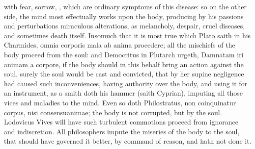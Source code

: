 {{with fear, sorrow, \etc{}, which are ordinary symptoms of this disease: so
on the other side, the mind most effectually works upon the body,
producing by his passions and perturbations miraculous alterations, as
melancholy, despair, cruel diseases, and sometimes death itself.
Insomuch that it is most true which Plato saith in his Charmides, omnia
corporis mala ab anima procedere; all the mischiefs of the body
proceed from the soul: and Democritus in Plutarch urgeth,
Damnatam iri animam a corpore, if the body should in this behalf bring
an action against the soul, surely the soul would be cast and
convicted, that by her supine negligence had caused such
inconveniences, having authority over the body, and using it for an
instrument, as a smith doth his hammer (saith Cyprian), imputing
all those vices and maladies to the mind. Even so doth
Philostratus, non coinquinatur corpus, nisi consensuanimae; the
body is not corrupted, but by the soul. Lodovicus Vives will have such
turbulent commotions proceed from ignorance and indiscretion. All
philosophers impute the miseries of the body to the soul, that should
have governed it better, by command of reason, and hath not done it.

}}
